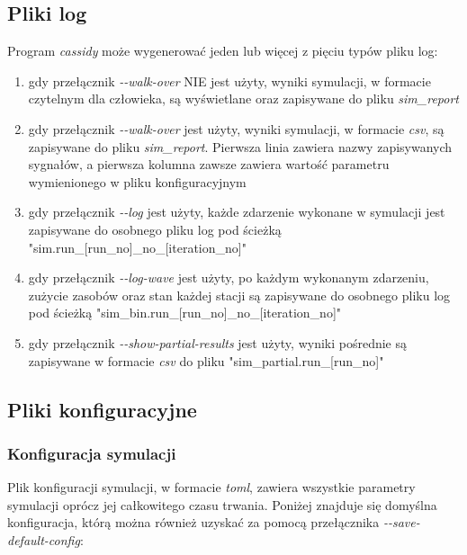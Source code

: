 \subsection{Pliki log}
Program \emph{cassidy} może wygenerować jeden lub więcej z pięciu typów pliku log:
\begin{enumerate}
\item gdy przełącznik \emph{-{}-walk-over} NIE jest użyty, wyniki symulacji, w formacie czytelnym dla człowieka, są wyświetlane oraz zapisywane do pliku \emph{sim\_report}
\item gdy przełącznik \emph{-{}-walk-over} jest użyty, wyniki symulacji, w formacie \emph{csv}, są zapisywane do pliku \emph{sim\_report}. Pierwsza linia zawiera nazwy zapisywanych sygnałów, a pierwsza kolumna zawsze zawiera wartość parametru wymienionego w pliku konfiguracyjnym
\item gdy przełącznik \emph{-{}-log} jest użyty, każde zdarzenie wykonane w symulacji jest zapisywane do osobnego pliku log pod ścieżką "sim.run\_[run\_no]\_no\_[iteration\_no]"
\item gdy przełącznik \emph{-{}-log-wave} jest użyty, po każdym wykonanym zdarzeniu, zużycie zasobów oraz stan każdej stacji są zapisywane do osobnego pliku log pod ścieżką "sim\_bin.run\_[run\_no]\_no\_[iteration\_no]"
\item gdy przełącznik \emph{-{}-show-partial-results} jest użyty, wyniki pośrednie są zapisywane w formacie \emph{csv} do pliku "sim\_partial.run\_[run\_no]"
\end{enumerate}

\subsection{Pliki konfiguracyjne}
\subsubsection{Konfiguracja symulacji}
Plik konfiguracji symulacji, w formacie \emph{toml}, zawiera wszystkie parametry symulacji oprócz jej całkowitego czasu trwania. Poniżej znajduje się domyślna konfiguracja, którą można również uzyskać za pomocą przełącznika \emph{-{}-save-default-config}:

